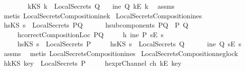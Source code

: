 \begin{isabellebody}
\ \ \ \ \ \ \ \ {\isachardoublequoteopen}kKS\ k\ {\isasymnotin}\ LocalSecrets\ Q{\isachardoublequoteclose}\isanewline
{}\ \ \ {\isachardoublequoteopen}ine\ Q\ {\isacharparenleft}kE\ k{\isacharparenright}{\isachardoublequoteclose}\ \isanewline
%
\isadelimproof
%
\endisadelimproof
%
\isatagproof
{}\isamarkupfalse%
\ assms\ \ \isamarkupfalse%
\ {\isacharparenleft}metis\ LocalSecretsComposition{\isacharunderscore}ine{}{\isacharunderscore}k{\isacharparenright}%
\endisatagproof
{\isafoldproof}%
%
\isadelimproof
\isanewline
%
\endisadelimproof
\isanewline
{}\isamarkupfalse%
\ LocalSecretsComposition{\isacharunderscore}ine{}{\isacharunderscore}s{\isacharcolon}\isanewline
{}\ h{}{\isacharcolon}{\isachardoublequoteopen}sKS\ s\ {\isasymin}\ LocalSecrets\ PQ{\isachardoublequoteclose}\ \isanewline
\ \ \ \ \ h{}{\isacharcolon}{\isachardoublequoteopen}subcomponents\ PQ\ {\isacharequal}\ {\isacharbraceleft}P{\isacharcomma}\ Q{\isacharbraceright}{\isachardoublequoteclose}\isanewline
\ \ \ \ \ h{}{\isacharcolon}{\isachardoublequoteopen}correctCompositionLoc\ PQ{\isachardoublequoteclose}\isanewline
\ \ \ \ \ h{}{\isacharcolon}{\isachardoublequoteopen}{\isasymnot}\ ine\ P\ {\isacharparenleft}sE\ s{\isacharparenright}{\isachardoublequoteclose}\isanewline
\ \ \ \ \ h{}{\isacharcolon}{\isachardoublequoteopen}sKS\ s\ {\isasymnotin}\ LocalSecrets\ P{\isachardoublequoteclose}\isanewline
\ \ \ \ \ h{}{\isacharcolon}{\isachardoublequoteopen}sKS\ s\ {\isasymnotin}\ LocalSecrets\ Q{\isachardoublequoteclose}\isanewline
\ \ \ \ \ \ {\isachardoublequoteopen}ine\ Q\ {\isacharparenleft}sE\ s{\isacharparenright}{\isachardoublequoteclose}\isanewline
%
\isadelimproof
%
\endisadelimproof
%
\isatagproof
{}\isamarkupfalse%
\ assms\ \isamarkupfalse%
\ {\isacharparenleft}metis\ LocalSecretsComposition{\isacharunderscore}ine{}{\isacharunderscore}s{\isacharparenright}%
\endisatagproof
{\isafoldproof}%
%
\isadelimproof
\isanewline
%
\endisadelimproof
\isanewline
{}\isamarkupfalse%
\ LocalSecretsComposition{\isacharunderscore}neg{\isacharunderscore}loc{\isacharunderscore}k{\isacharcolon}\isanewline
{}\ h{}{\isacharcolon}{\isachardoublequoteopen}kKS\ key\ {\isasymnotin}\ LocalSecrets\ P{\isachardoublequoteclose}\isanewline
\ \ \ \ \ h{}{\isacharcolon}{\isachardoublequoteopen}exprChannel\ ch\ {\isacharparenleft}kE\ key{\isacharparenright}{\isachardoublequoteclose}\isanewline

\end{isabellebody}
